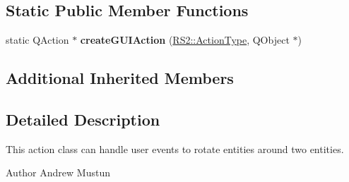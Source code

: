 \subsection*{Static Public Member Functions}
\begin{DoxyCompactItemize}
\item 
\hypertarget{classRS__ActionModifyRotate2_a510fc0698562e5573efc43ed95559012}{static Q\-Action $\ast$ {\bfseries create\-G\-U\-I\-Action} (\hyperlink{classRS2_afe3523e0bc41fd637b892321cfc4b9d7}{R\-S2\-::\-Action\-Type}, Q\-Object $\ast$)}\label{classRS__ActionModifyRotate2_a510fc0698562e5573efc43ed95559012}

\end{DoxyCompactItemize}
\subsection*{Additional Inherited Members}


\subsection{Detailed Description}
This action class can handle user events to rotate entities around two entities.

\begin{DoxyAuthor}{Author}
Andrew Mustun 
\end{DoxyAuthor}


